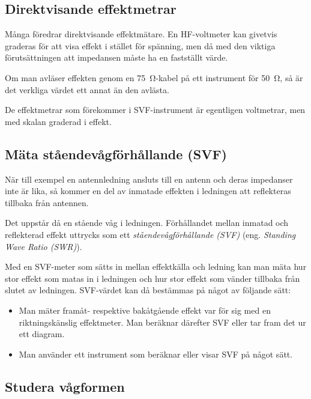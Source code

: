 \subsection{Direktvisande effektmetrar}

Många föredrar direktvisande effektmätare.
En HF-voltmeter kan givetvis graderas för att visa effekt i stället för
spänning, men då med den viktiga förutsättningen att impedansen måste ha en
fastställt värde.

Om man avläser effekten genom en \SI{75}{\ohm}-kabel på ett instrument för
\SI{50}{\ohm}, så är det verkliga värdet ett annat än den avlästa.

De effektmetrar som förekommer i SVF-instrument är egentligen voltmetrar,
men med skalan graderad i effekt.

\subsection{Mäta ståendevågförhållande (SVF)}
\label{mäta ståendevåg}
\label{ståendevågförhållande (SVF)}
\label{Standing Wave Ratio (SWR)}

När till exempel en antennledning ansluts till en antenn och deras impedanser
inte är lika, så kommer en del av inmatade effekten i ledningen att
reflekteras tillbaka från antennen.

Det uppstår då en stående våg i ledningen. Förhållandet mellan inmatad
och reflekterad effekt uttrycks som ett \emph{ståendevågförhållande (SVF)}
(eng. \emph{Standing Wave Ratio (SWR)}).

Med en SVF-meter som sätts in mellan effektkälla och ledning kan man
mäta hur stor effekt som matas in i ledningen och hur stor effekt som
vänder tillbaka från slutet av ledningen.
SVF-värdet kan då bestämmas på något av följande sätt:

\begin{itemize}
\item Man mäter framåt- respektive bakåtgående effekt var för sig med
  en riktningskänslig effektmeter.
  Man beräknar därefter SVF eller tar fram det ur ett diagram.
\item Man använder ett instrument som beräknar eller visar SVF på något sätt.
\end{itemize}

\subsection{Studera vågformen}

